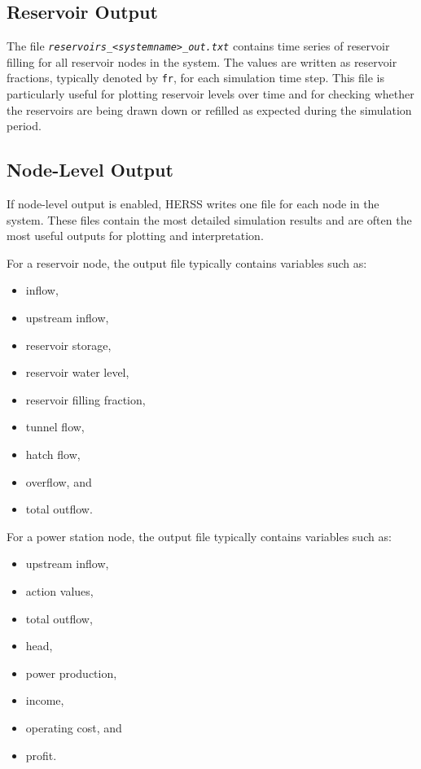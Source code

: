 \documentclass[a4paper, 12pt]{report}
\newcommand{\file}[1]{\textit{\texttt{#1}}}  %
\begin{document}
	\subsection{Reservoir Output}

	The file \file{reservoirs\_<systemname>\_out.txt} contains time series of reservoir filling for all reservoir nodes in the system. The values are written as reservoir fractions, typically denoted by \texttt{fr}, for each simulation time step. This file is particularly useful for plotting reservoir levels over time and for checking whether the reservoirs are being drawn down or refilled as expected during the simulation period.

	\subsection{Node-Level Output}

	If node-level output is enabled, HERSS writes one file for each node in the system. These files contain the most detailed simulation results and are often the most useful outputs for plotting and interpretation.

	For a reservoir node, the output file typically contains variables such as:

	\begin{itemize}
		\item inflow,
		\item upstream inflow,
		\item reservoir storage,
		\item reservoir water level,
		\item reservoir filling fraction,
		\item tunnel flow,
		\item hatch flow,
		\item overflow, and
		\item total outflow.
	\end{itemize}

	For a power station node, the output file typically contains variables such as:

	\begin{itemize}
		\item upstream inflow,
		\item action values,
		\item total outflow,
		\item head,
		\item power production,
		\item income,
		\item operating cost, and
		\item profit.
	\end{itemize}
\end{document}
